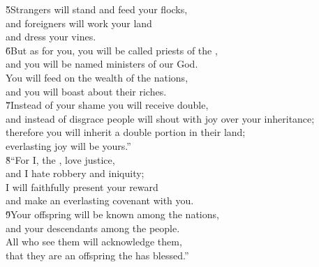 \begin{poetry}
\poeml \v{5}Strangers will stand and feed your flocks, \\
\poemll    and foreigners will work your land \\
\poemlll       and dress your vines. \\
\poeml \v{6}But as for you, you will be called priests of the , \\
\poemll    and you will be named ministers of our God. \\
\poeml You will feed on the wealth of the nations, \\
\poemll    and you will boast about their riches. \\
\poeml \v{7}Instead of your shame you will receive double, \\
\poemll    and instead of disgrace people will shout with joy over your inheritance; \\
\poeml therefore you will inherit a double portion in their land; \\
\poemll    everlasting joy will be yours.'' \\
\poeml \v{8}``For I, the , love justice, \\
\poemll    and I hate robbery and iniquity; \\
\poeml I will faithfully present your reward \\
\poemll    and make an everlasting covenant with you. \\
\poeml \v{9}Your offspring will be known among the nations, \\
\poemll    and your descendants among the people. \\
\poeml All who see them will acknowledge them, \\
\poemll    that they are an offspring the  has blessed.''

\end{poetry}
